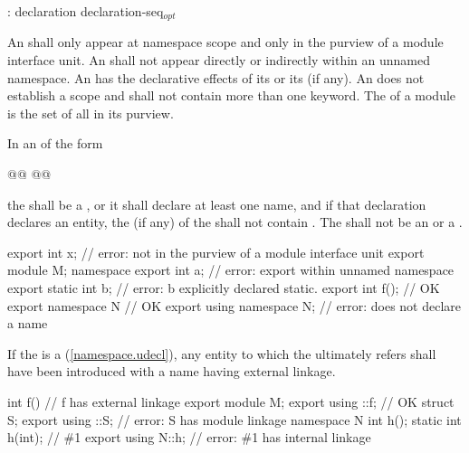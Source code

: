 \begin{std.txt}\color{addclr}
  \begin{bnf}\color{addclr}
    :\br
       declaration\br 
       \terminal{\{} declaration-seq${}_{opt}$ \terminal{\}} 
  \end{bnf}

  \resetalinea[0]
  \alinea 
  An  shall only appear
  at namespace scope and only in the purview of a module interface unit. 
  An  shall not appear directly
  or indirectly within an unnamed namespace. 
  An 
   has the declarative effects of its 
  or its  (if any).
  An  does not
  establish a scope and shall not contain more than one
   keyword.
  The  of a module  is the set of all
   in its purview.

  \alinea
  In an  of the form
  \begin{grammar}
        @@ @@
  \end{grammar}
  the  shall be a ,
  or it shall declare at least one name,
  and if that declaration declares an entity, the 
   (if any) of the 
   shall not contain .
  The  shall not be an
  or a .
  \begin{example}
    \begin{codeblock}
      export int x;             // error: not in the purview of a module interface unit
      export module M;
      namespace {
        export int a;           // error: export within unnamed namespace
      }
      export static int b;      // error: b explicitly declared static.
      export int f();           // OK
      export namespace N { }    // OK
      export using namespace N; // error: does not declare a name
    \end{codeblock}
  \end{example}

  If the  is a 
  (\ref{namespace.udecl}), any entity to which the
   ultimately refers shall have been introduced
  with a name having external linkage.
  \begin{example}
    \begin{codeblock}
      int f()               // f has external linkage
      export module M;
      export using ::f;     // OK
      struct S;
      export using ::S;     // error: S has module linkage
      namespace N {
        int h();
        static int h(int);  // \#1
      }
      export using N::h;    // error: \#1 has internal linkage
    \end{codeblock}
  \end{example}



\end{std.txt}
